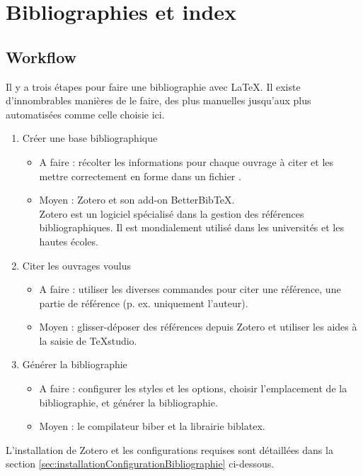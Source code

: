\chapter{Bibliographies et index}





\section{Workflow}

Il y a trois étapes pour faire une bibliographie avec \LaTeX. Il existe d'innombrables manières de le faire, des plus manuelles jusqu'aux plus automatisées comme celle choisie ici.
\begin{enumerate}
	\item Créer une base bibliographique
		\begin{itemize}
			\item A faire : récolter les informations pour chaque ouvrage à citer et les mettre correctement en forme dans un fichier .
			\item Moyen : Zotero et son add-on BetterBibTeX. \\
				Zotero est un logiciel spécialisé dans la gestion des références bibliographiques. Il est mondialement utilisé dans les universités et les hautes écoles.
		\end{itemize} 
	\item Citer les ouvrages voulus
		\begin{itemize}
			\item A faire : utiliser les diverses commandes pour citer une référence, une partie de référence (p. ex. uniquement l'auteur).
			\item Moyen : glisser-déposer des références depuis Zotero et utiliser les aides à la saisie de TeXstudio.
		\end{itemize}
	\item Générer la bibliographie
		\begin{itemize}
			\item A faire : configurer les styles et les options, choisir l'emplacement de la bibliographie, et générer la bibliographie.
			\item Moyen : le compilateur biber et la librairie biblatex.
		\end{itemize}
\end{enumerate}

L'installation de Zotero et les configurations requises sont détaillées dans la section \ref{sec:installationConfigurationBibliographie} ci-dessous.





